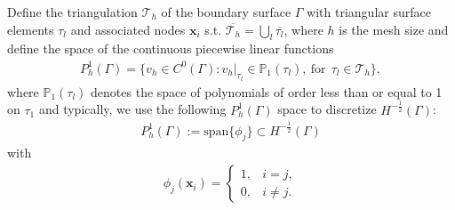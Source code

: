 Define the 
triangulation $\mathcal{T}_{h}$ of the boundary surface $\Gamma$ with triangular surface elements $\tau_{l}$ and associated nodes $\boldsymbol{x}_{i}$ 
s.t. $\overline{\mathcal{T}_{h}} = \bigcup_{l}\overline{\tau_{l}}$, where $h$ is the mesh size and define the space of the continuous piecewise linear functions
\begin{align*}
    P_{h}^{1}(\Gamma) = \{v_{h}\in C^{0}(\Gamma): v_{h}|_{\tau_{l}}\in\mathbb{P}_{1}(\tau_{l}), \ \text{for} \ \ \tau_{l}\in\mathcal{T}_{h}\},
\end{align*}
where $\mathbb{P}_{1}(\tau_{l})$ denotes the space of polynomials of order less than or equal to 1 on $\tau_{1}$
and typically, we use the following $P_{h}^{1}(\Gamma)$ space to discretize $H^{-\frac{1}{2}}(\Gamma)$:
\begin{align*}
    P_{h}^{1}(\Gamma) := \text{span}\{\phi_{j}\} \subset H^{-\frac{1}{2}}(\Gamma)
\end{align*}
with 
\begin{align*}
    \phi_{j}(\boldsymbol{x}_{i}) = \begin{cases}
        1, & i = j,\\
        0, & i\neq j.
    \end{cases}
\end{align*}

